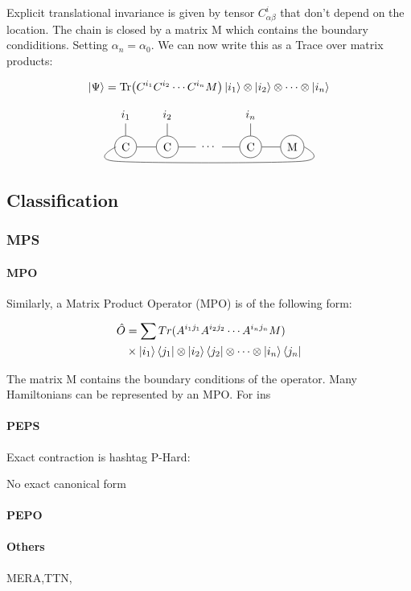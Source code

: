 Explicit translational invariance is given by tensor $C^i_{\alpha \beta }$ that don't depend on the location. The chain is closed by a matrix M which contains the boundary condiditions. Setting $\alpha_n = \alpha_0$. We can now write this as a Trace over matrix products:

\begin{equation}
    \ket{\Psi} = \Tr( C^{i_1} C^{i_2} \cdots C^{i_n} M  ) \ket{i_1} \otimes \ket{i_2} \otimes \cdots \otimes \ket{i_n}
\end{equation}

\begin{equation}
    \mpo{5}{{"Tr",,,,,}}{{"$i_1$","$i_2$",,"$i_n$","-"}}{{"-","-",,"-","-"}}{{0,0,1,0,0}}{{"C", "C",,"C","M" }}
\end{equation}

\subsection{Classification}

\subsubsection{MPS}

\paragraph{MPO}

Similarly, a Matrix Product Operator (MPO) is of the following form:

\begin{equation} \label{def_mpo}
    \begin{split}
        \hat{O} &= \sum Tr(A^{i_1 j_1} A^{i_2 j_2} \cdots A^{i_n j_n} M) \\
        & \times \ket{i_1}\bra{j_1} \otimes \ket{i_2}\bra{j_2} \otimes \cdots \otimes \ket{i_n}\bra{j_n}
    \end{split}
\end{equation}


The matrix M contains the boundary conditions of the operator. Many Hamiltonians can be represented by an MPO. For ins

\paragraph{PEPS}

Exact contraction is hashtag P-Hard:

No exact canonical form

\paragraph{PEPO}

\paragraph{Others}

MERA,TTN,



